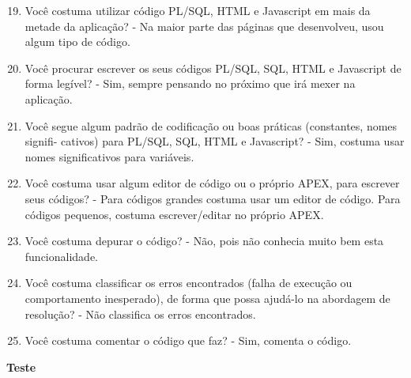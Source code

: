 \begin{apendicesenv}
\begin{enumerate}
	\setcounter{enumi}{18}
	\item Você costuma utilizar código PL/SQL, HTML e Javascript em mais da metade da
	aplicação?\newline
	- Na maior parte das páginas que desenvolveu, usou algum tipo de código.
	\item Você procurar escrever os seus códigos PL/SQL, SQL, HTML e Javascript de forma
	legível?\newline
	- Sim, sempre pensando no próximo que irá mexer na aplicação.
	\item Você segue algum padrão de codificação ou boas práticas (constantes, nomes signifi-
	cativos) para PL/SQL, SQL, HTML e Javascript?\newline
	- Sim, costuma usar nomes significativos para variáveis.
	\item Você costuma usar algum editor de código ou o próprio APEX, para escrever seus
	códigos?\newline
	- Para códigos grandes costuma usar um editor de código. Para códigos pequenos, costuma escrever/editar no próprio APEX.
	\item Você costuma depurar o código?\newline
	- Não, pois não conhecia muito bem esta funcionalidade.
	\item Você costuma classificar os erros encontrados (falha de execução ou comportamento
	inesperado), de forma que possa ajudá-lo na abordagem de resolução?\newline
	- Não classifica os erros encontrados.
	\item Você costuma comentar o código que faz?\newline
	- Sim, comenta o código.
\end{enumerate}

\textbf{Teste}


\end{apendicesenv}
